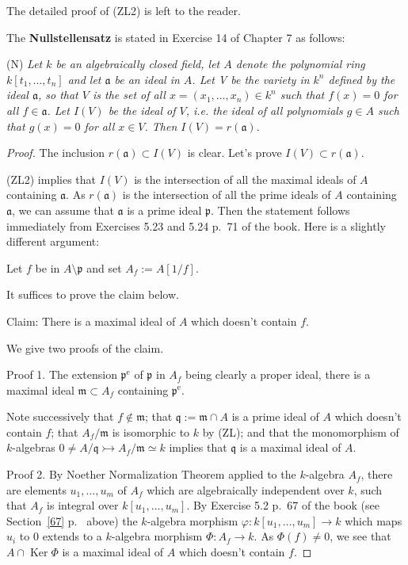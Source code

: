 \documentclass[parskip=half,fontsize=12pt]{scrartcl}%
\newcommand{\oo}{\operatorname}\newcommand{\ooo}{\operatorname*}
\newcommand{\mf}{\mathfrak}
\newcommand{\ppp}{\mf p}
\newcommand{\mono}{\rightarrowtail}
\begin{document}
The detailed proof of (ZL2) is left to the reader.

The \textbf{Nullstellensatz} is stated in Exercise 14 of Chapter 7 as follows:

(N) \emph{Let $k$ be an algebraically closed field, let $A$ denote the polynomial ring $k[t_1,\dots,t_n]$ and let $\mf a$ be an ideal in $A$. Let V be the variety in $k^n$ defined by the ideal $\mf a$, so that $V$ is the set of all $x=(x_1,\dots,x_n)\in k^n$ such that $f(x)=0$ for all $f\in\mf a$. Let $I(V)$ be the ideal of $V$, i.e. the ideal of all polynomials $g\in A$ such that $g(x)=0$ for all $x\in V$. Then $I(V)=r(\mf a)$.}

\begin{proof} 
The inclusion $r(\mf a)\subset I(V)$ is clear. Let's prove $I(V)\subset r(\mf a)$. 

(ZL2) implies that $I(V)$ is the intersection of all the maximal ideals of $A$ containing $\mf a$. As $r(\mf a)$ is the intersection of all the prime ideals of $A$ containing $\mf a$, we can assume that $\mf a$ is a prime ideal $\ppp$. Then the statement follows immediately from Exercises 5.23 and 5.24 p.~71 of the book. Here is a slightly different argument:

Let $f$ be in $A\setminus\ppp$ and set $A_f:=A[1/f]$.

It suffices to prove the claim below.

Claim: There is a maximal ideal of $A$ which doesn't contain $f$. 

We give two proofs of the claim.

Proof 1. The extension $\ppp^{\oo e}$ of $\ppp$ in $A_f$ being clearly a proper ideal, there is a maximal ideal $\mf m\subset A_f$ containing $\ppp^{\oo e}$. 

Note successively that $f\notin\mf m$; that $\mf q:=\mf m\cap A$ is a prime ideal of $A$ which doesn't contain $f$; that $A_f/\mf m$ is isomorphic to $k$ by (ZL); and that the monomorphism of $k$-algebras $0\ne A/\mf q\mono A_f/\mf m\simeq k$ implies that $\mf q$ is a maximal ideal of $A$.

Proof 2. By Noether Normalization Theorem applied to the $k$-algebra $A_f$, there are elements $u_1,\dots,u_m$ of $A_f$ which are algebraically independent over $k$, such that $A_f$ is integral over $k[u_1,\dots,u_m]$. By Exercise 5.2 %
p.~67 of the book (see Section~\ref{67} p.~\pageref{67} above) the $k$-algebra morphism $\varphi:k[u_1,\dots,u_m]\to k$ which maps $u_i$ to $0$ extends to a $k$-algebra morphism $\Phi:A_f\to k$. As $\Phi(f)\ne0$, we see that $A\cap\oo{Ker}\Phi$ is a maximal ideal of $A$ which doesn't contain $f$.
\end{proof}
\end{document}
